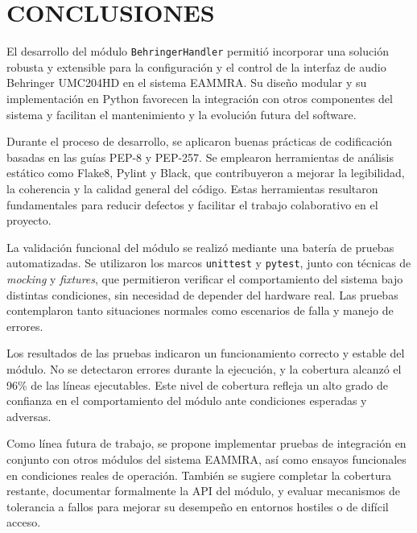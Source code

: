 \clearpage
\section{CONCLUSIONES}

El desarrollo del módulo \texttt{BehringerHandler} permitió incorporar una solución robusta y extensible para la configuración y el control de la interfaz de audio Behringer UMC204HD en el sistema EAMMRA. Su diseño modular y su implementación en Python favorecen la integración con otros componentes del sistema y facilitan el mantenimiento y la evolución futura del software.

Durante el proceso de desarrollo, se aplicaron buenas prácticas de codificación basadas en las guías PEP-8 y PEP-257. Se emplearon herramientas de análisis estático como Flake8, Pylint y Black, que contribuyeron a mejorar la legibilidad, la coherencia y la calidad general del código. Estas herramientas resultaron fundamentales para reducir defectos y facilitar el trabajo colaborativo en el proyecto.

La validación funcional del módulo se realizó mediante una batería de pruebas automatizadas. Se utilizaron los marcos \texttt{unittest} y \texttt{pytest}, junto con técnicas de \textit{mocking} y \textit{fixtures}, que permitieron verificar el comportamiento del sistema bajo distintas condiciones, sin necesidad de depender del hardware real. Las pruebas contemplaron tanto situaciones normales como escenarios de falla y manejo de errores.

Los resultados de las pruebas indicaron un funcionamiento correcto y estable del módulo. No se detectaron errores durante la ejecución, y la cobertura alcanzó el 96\% de las líneas ejecutables. Este nivel de cobertura refleja un alto grado de confianza en el comportamiento del módulo ante condiciones esperadas y adversas.

Como línea futura de trabajo, se propone implementar pruebas de integración en conjunto con otros módulos del sistema EAMMRA, así como ensayos funcionales en condiciones reales de operación. También se sugiere completar la cobertura restante, documentar formalmente la API del módulo, y evaluar mecanismos de tolerancia a fallos para mejorar su desempeño en entornos hostiles o de difícil acceso.
%